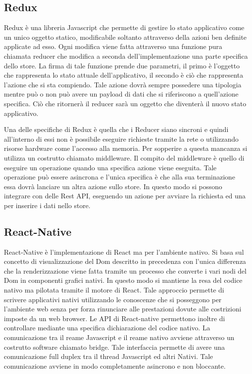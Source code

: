 	\subsection{Redux}\vspace{5mm}
	
	Redux è una libreria Javascript che permette di gestire lo stato applicativo come un unico oggetto statico, modificabile soltanto attraverso della azioni ben definite applicate ad esso. Ogni modifica viene fatta attraverso una funzione pura\cite{PureFunction} chiamata reducer che modifica a seconda dell'implementazione una parte specifica dello store. La firma di tale funzione prende due parametri, il primo è l'oggetto che rappresenta lo stato attuale dell'applicativo, il secondo è ciò che rappresenta l'azione che si sta compiendo. Tale azione dovrà sempre possedere una tipologia mentre può o non può avere un payload di dati che si riferiscono a quell'azione specifica. Ciò che ritornerà il reducer sarà un oggetto che diventerà il nuovo stato applicativo.\vspace{5mm}
	
	Una delle specifiche di Redux è quella che i Reducer siano sincroni e quindi all'interno di essi non è possibile eseguire richieste tramite la rete o utilizzando risorse hardware come l'accesso alla memoria. Per sopperire a questa mancanza si utilizza un costrutto chiamato middleware. Il compito del middleware è quello di eseguire un operazione quando una specifica azione viene eseguita. Tale operazione può essere asincrona e l'unica specifica è che alla sua terminazione essa dovrà lanciare un altra azione sullo store. In questo modo si possono integrare con delle Rest API, eseguendo un azione per avviare la richiesta ed una per inserire i dati nello store.
	
\subsection{React-Native}\vspace{5mm}

	React-Native è l'implementazione di React ma per l’ambiente nativo. Si basa sul concetto di visualizzazione del Dom descritto in precedenza con l'unica differenza che la renderizzazione viene fatta tramite un processo che converte i vari nodi del Dom in componenti grafici nativi. In questo modo si mantiene la resa del codice nativo ma pilotata tramite il motore di React. Tale approccio permette di scrivere applicativi nativi utilizzando le conoscenze che si posseggono per l'ambiente web senza per forza rinunciare alle prestazioni dovute alle costrizioni imposte da un web browser. Le API di React-native permettono inoltre di controllare mediante una specifica dichiarazione del codice nativo. La comunicazione tra il reame Javascript e il reame nativo avviene attraverso un costrutto software chiamato bridge. Tale interfaccia permette di avere una comunicazione full duplex tra il thread Javascript ed altri Nativi. Tale comunicazione avviene in modo completamente asincrono e non bloccante.\vspace{5mm}

